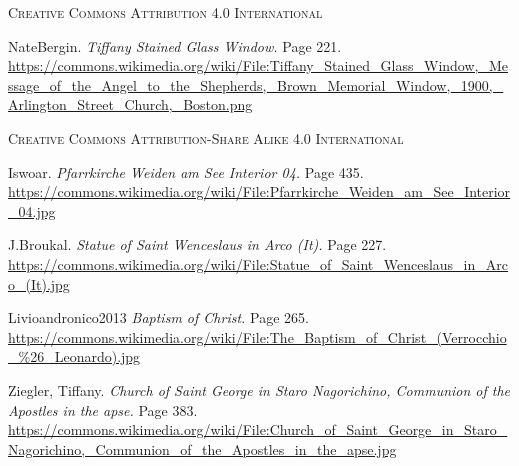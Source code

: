 \begin{FlushLeft}
\par\noindent
\centerline{\textsc{Creative Commons Attribution 4.0 International}}

NateBergin. \textit{Tiffany Stained Glass Window.} Page 221. \url{https://commons.wikimedia.org/wiki/File:Tiffany_Stained_Glass_Window,_Message_of_the_Angel_to_the_Shepherds,_Brown_Memorial_Window,_1900,_Arlington_Street_Church,_Boston.png}

\vspace{0.5\baselineskip}

\par\noindent
\centerline{\textsc{Creative Commons Attribution-Share Alike 4.0 International}}

Iswoar. \textit{Pfarrkirche Weiden am See Interior 04.} Page 435. \url{https://commons.wikimedia.org/wiki/File:Pfarrkirche_Weiden_am_See_Interior_04.jpg}

J.Broukal. \textit{Statue of Saint Wenceslaus in Arco (It).} Page 227. \url{https://commons.wikimedia.org/wiki/File:Statue_of_Saint_Wenceslaus_in_Arco_(It).jpg}

Livioandronico2013 \textit{Baptism of Christ.} Page 265. \url{https://commons.wikimedia.org/wiki/File:The_Baptism_of_Christ_(Verrocchio_\%26_Leonardo).jpg}

Ziegler, Tiffany. \textit{Church of Saint George in Staro Nagorichino, Communion of the Apostles in the apse.} Page 383. \url{https://commons.wikimedia.org/wiki/File:Church_of_Saint_George_in_Staro_Nagorichino,_Communion_of_the_Apostles_in_the_apse.jpg}

\end{FlushLeft}